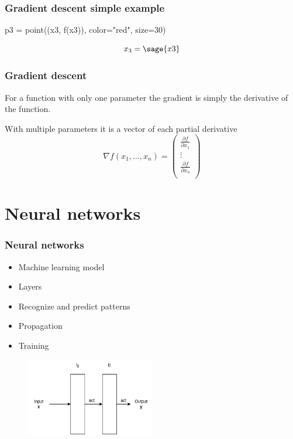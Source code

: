 \documentclass{beamer}
\begin{document}
\begin{frame}[fragile]
    \frametitle{Gradient descent simple example}
    \begin{sageblock}
p3 = point((x3, f(x3)), color="red", size=30)
    \end{sageblock}
    \begin{figure}
        \centering
    \end{figure}
    $$x_3 = \sage{x3}$$
\end{frame}

\begin{frame}
    \frametitle{Gradient descent}
    For a function with only one parameter the gradient is simply the derivative of the function.

    With multiple parameters it is a vector of each partial derivative
    $$\nabla f(x_1, ..., x_n) = \left( \begin{array}{c}
    \frac{\partial f}{\partial x_1}\\
    \vdots\\
    \frac{\partial f}{\partial x_n}\\
\end{array} \right)$$
\end{frame}


\section{Neural networks}

\begin{frame}
    \frametitle{Neural networks}

    \begin{itemize}
        \item Machine learning model
        \item Layers
        \item Recognize and predict patterns
        \item Propagation
        \item Training
    \end{itemize}

    \begin{figure}
        \centering
        \includegraphics[width=0.5\textwidth]{../assets/nn-simple-example.png}
    \end{figure}
\end{frame}
\end{document}
